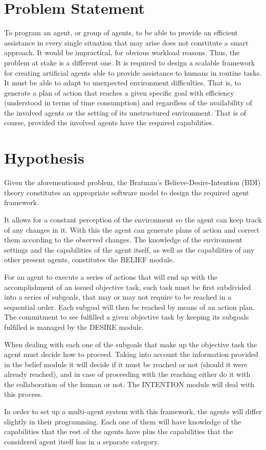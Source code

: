 \section{Problem Statement}
To program an agent, or group of agents, to be able to provide an efficient assistance in every single situation that may arise does not constitute a smart approach. It would be impractical, for obvious workload reasons. Thus, the problem at stake is a different one.
It is required to design a scalable framework for creating artificial agents able to provide assistance to humans in routine tasks. It must be able to adapt to unexpected environment difficulties. That is, to generate a plan of action that reaches a given specific goal with efficiency (understood in terms of time consumption) and regardless of the availability of the involved agents or the setting of its unstructured environment. That is of course, provided the involved agents have the required capabilities.

\section{Hypothesis}
Given the aforementioned problem, the Bratman's Believe-Desire-Intention (BDI) theory constitutes an appropriate software model to design the required agent framework.\par
It allows for a constant perception of the environment so the agent can keep track of any changes in it. With this the agent can generate plans of action and correct them according to the observed changes. The knowledge of the environment settings and the capabilities of the agent itself, as well as the capabilities of any other present agents, constitutes the BELIEF module.\par 
For an agent to execute a series of actions that will end up with the accomplishment of an issued objective task, such task must be first subdivided into a series of subgoals, that may or may not require to be reached in a sequential order. Each subgoal will then be reached by means of an action plan. The commitment to see fulfilled a given objective task by keeping its subgoals fulfilled is managed by the DESIRE module.\par
When dealing with each one of the subgoals that make up the objective task the agent must decide how to proceed. Taking into account the information provided in the belief module it will decide if it must be reached or not (should it were already reached), and in case of proceeding with the reaching either do it with the collaboration of the human or not. The INTENTION module will deal with this process.\par
In order to set up a multi-agent system with this framework, the agents will differ slightly in their programming. Each one of them will have knowledge of the capabilities that the rest of the agents have plus the capabilities that the considered agent itself has in a separate category.

